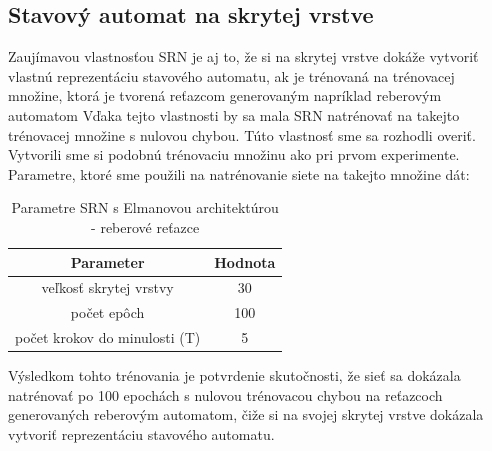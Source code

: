 \subsection{Stavový automat na skrytej vrstve}
Zaujímavou vlastnosťou SRN je aj to, že si na skrytej vrstve dokáže vytvoriť vlastnú reprezentáciu stavového automatu, ak 
je trénovaná na trénovacej množine, ktorá je tvorená reťazcom generovaným napríklad reberovým automatom \cite{Servan-Schreiber1991}
Vďaka tejto vlastnosti by sa mala SRN natrénovať na takejto trénovacej množine s nulovou chybou.
Túto vlastnosť sme sa rozhodli overiť.
Vytvorili sme si podobnú trénovaciu množinu ako pri prvom experimente.
Parametre, ktoré sme použili na natrénovanie siete na takejto množine dát:
\begin{table}[h!]
    \centering
    \begin{tabular}{|c|c|} 
    \hline
    Parameter & Hodnota \\ 
    \hline
    veľkosť skrytej vrstvy & 30  \\
    \hline
    počet epôch & 100  \\
    \hline
    počet krokov do minulosti (T) & 5 \\
    \hline
    \end{tabular}
    \caption{Parametre SRN s Elmanovou architektúrou - reberové reťazce}
    \label{table:1}
\end{table}
Výsledkom tohto trénovania je potvrdenie skutočnosti, že sieť sa dokázala 
natrénovať po 100 epochách s nulovou trénovacou chybou na reťazcoch generovaných reberovým automatom, 
čiže si na svojej skrytej vrstve dokázala vytvoriť reprezentáciu stavového automatu.






